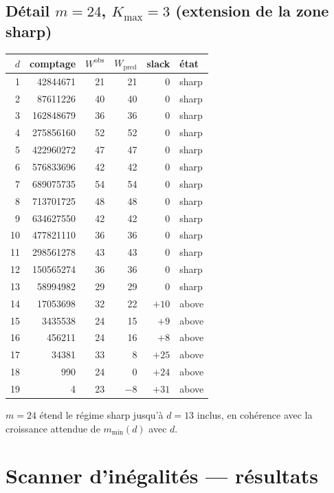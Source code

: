 \documentclass[11pt,a4paper]{article}
\begin{document}
\subsection{Détail $m=24$, $K_{\max}=3$ (extension de la zone sharp)}

\begin{center}\small
\begin{tabular}{rrrrrl}
\toprule
$d$ & comptage & $W^{\text{obs}}$ & $W_{\mathrm{pred}}$ & slack & état \\
\midrule
 1 & \num{42844671}  & 21 & 21 & 0 & sharp \\
 2 & \num{87611226}  & 40 & 40 & 0 & sharp \\
 3 & \num{162848679} & 36 & 36 & 0 & sharp \\
 4 & \num{275856160} & 52 & 52 & 0 & sharp \\
 5 & \num{422960272} & 47 & 47 & 0 & sharp \\
 6 & \num{576833696} & 42 & 42 & 0 & sharp \\
 7 & \num{689075735} & 54 & 54 & 0 & sharp \\
 8 & \num{713701725} & 48 & 48 & 0 & sharp \\
 9 & \num{634627550} & 42 & 42 & 0 & sharp \\
10 & \num{477821110} & 36 & 36 & 0 & sharp \\
11 & \num{298561278} & 43 & 43 & 0 & sharp \\
12 & \num{150565274} & 36 & 36 & 0 & sharp \\
13 & \num{58994982}  & 29 & 29 & 0 & sharp \\
14 & \num{17053698}  & 32 & 22 & $+10$ & above \\
15 & \num{3435538}   & 24 & 15 & $+9$  & above \\
16 & \num{456211}    & 24 & 16 & $+8$  & above \\
17 & \num{34381}     & 33 &  8 & $+25$ & above \\
18 & \num{990}       & 24 &  0 & $+24$ & above \\
19 & \num{4}         & 23 & $-8$ & $+31$ & above \\
\bottomrule
\end{tabular}
\end{center}

$m=24$ étend le régime sharp jusqu'à $d=13$ inclus, en cohérence avec
la croissance attendue de $m_{\min}(d)$ avec $d$.

\section{Scanner d'inégalités --- résultats}
\end{document}
